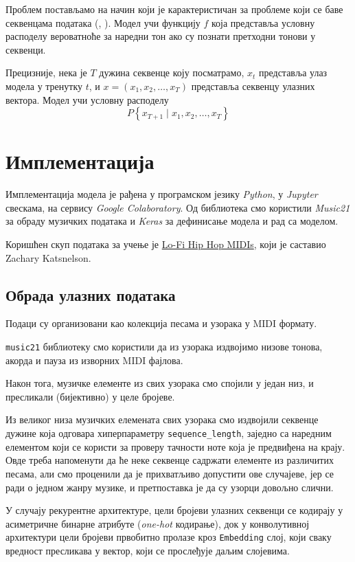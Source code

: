 \documentclass[11pt]{article}
\begin{document}
Проблем постављамо на начин који је карактеристичан за проблеме који се баве секвенцама података (\cite{graves_generating_2013}, \cite{van_der_oord_wavenet_2016}). Модел учи функцију \(f\) која представља условну расподелу вероватноће за наредни тон ако су познати претходни тонови у секвенци.

Прецизније, нека је \(T\) дужина секвенце коју посматрамо, \(x_t\) представља улаз модела у тренутку \(t\), и \(x = (x_1, x_2, \ldots, x_T)\) представља секвенцу улазних вектора. Модел учи условну расподелу
$$
P \left \{ x_{T + 1} \mid x_1, x_2, \ldots, x_T \right\}
$$

\section{Имплементација}
\label{sec:org0afbf05}
Имплементација модела је рађена у програмском језику \emph{Python}, у \emph{Jupyter} свескама, на сервису \emph{Google Colaboratory}. Од библиотека смо користили \emph{Music21} за обраду музичких података и \emph{Keras} за дефинисање модела и рад са моделом.

Коришћен скуп података за учење је \href{https://www.kaggle.com/zakarii/lofi-hip-hop-midi}{Lo-Fi Hip Hop MIDIs}, који је саставио Zachary Katsnelson.

\subsection{Обрада улазних података}
\label{sec:orgf3cd130}
Подаци су организовани као колекција песама и узорака у MIDI формату.

\texttt{music21} библиотеку смо користили да из узорака издвојимо низове тонова, акорда и пауза из изворних MIDI фајлова.

Након тога, музичке елементе из свих узорака смо спојили у један низ, и пресликали (бијективно) у целе бројеве.

Из великог низа музичких елемената свих узорака смо издвојили секвенце дужине која одговара хиперпараметру \texttt{sequence\_length}, заједно са наредним елементом који се користи за проверу тачности ноте која је предвиђена на крају. Овде треба напоменути да ће неке секвенце садржати елементе из различитих песама, али смо проценили да је прихватљиво допустити ове случајеве, јер се ради о једном жанру музике, и претпоставка је да су узорци довољно слични.

У случају рекурентне архитектуре, цели бројеви улазних секвенци се кодирају у асиметричне бинарне атрибуте (\emph{one-hot} кодирање), док у конволутивној архитектури цели бројеви првобитно пролазе кроз \texttt{Embedding} слој, који сваку вредност пресликава у вектор, који се прослеђује даљим слојевима.
\end{document}
